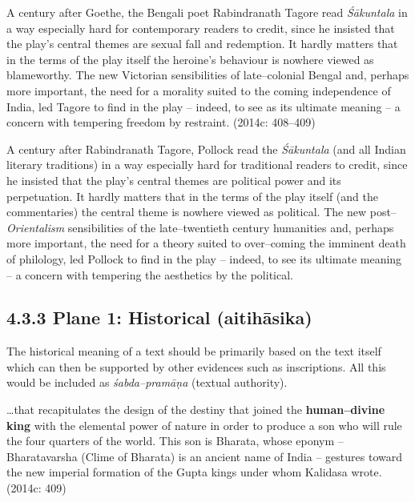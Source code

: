 \begin{myquote}
A century after Goethe, the Bengali poet Rabindranath Tagore read \textit{Śākuntala} in a way especially hard for contemporary readers to credit, since he insisted that the play’s central themes are sexual fall and redemption. It hardly matters that in the terms of the play itself the heroine’s behaviour is nowhere viewed as blameworthy. The new Victorian sensibilities of late–colonial Bengal and, perhaps more important, the need for a morality suited to the coming independence of India, led Tagore to find in the play – indeed, to see as its ultimate meaning – a concern with tempering freedom by restraint. (2014c: 408–409)
\end{myquote}

A century after Rabindranath Tagore, Pollock read the \textit{Śākuntala} (and all Indian literary traditions) in a way especially hard for traditional readers to credit, since he insisted that the play’s central themes are political power and its perpetuation. It hardly matters that in the terms of the play itself (and the commentaries) the central theme is nowhere viewed as political. The new post–\textit{Orientalism} sensibilities of the late–twentieth century humanities and, perhaps more important, the need for a theory suited to over–coming the imminent death of philology, led Pollock to find in the play – indeed, to see its ultimate meaning – a concern with tempering the aesthetics by the political.


\subsection*{4.3.3 Plane 1: Historical (aitihāsika)}

The historical meaning of a text should be primarily based on the text itself which can then be supported by other evidences such as inscriptions. All this would be included as \textit{śabda–pramāṇa} (textual authority).

\begin{myquote}
…that recapitulates the design of the destiny that joined the \textbf{human–divine king} with the elemental power of nature in order to produce a son who will rule the four quarters of the world. This son is Bharata, whose eponym – Bharatavarsha (Clime of Bharata) is an ancient name of India – gestures toward the new imperial formation of the Gupta kings under whom Kalidasa wrote. (2014c: 409)
\end{myquote}

